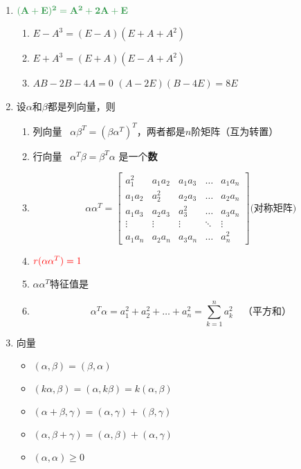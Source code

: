 \documentclass[a4paper,12pt]{article}
\begin{document}
\begin{enumerate}
        \item $\color[rgb]{0.2, 0.6, 0.3}{\mathbf{(A + E)^2 = A^2 + 2A + E}}$
        \begin{enumerate}
            \item $E - A^3 = (E - A)(E + A + A^2)$
            \item $E + A^3 = (E + A)(E - A + A^2)$
            \item $AB - 2B - 4A = 0$ \Leftrightarrow \; $(A - 2E)(B - 4E) = 8E$
        \end{enumerate}
        \item 设$\alpha$和$\beta$都是列向量，则
        \begin{enumerate}
            \item 列向量 \cdot {} \, $\alpha\beta^T = (\beta\alpha^T)^T$，两者都是$n$阶矩阵（互为转置）
            \item 行向量 \cdot {} \, $\alpha^T\beta = \beta^T\alpha$ 是一个\textbf{数}
            \item
            \[
                \alpha\alpha^T =
                \begin{bmatrix}
                    a_1^2   & a_1 a_2 & a_1 a_3 & \dots  & a_1 a_n \\
                    a_1 a_2 & a_2^2   & a_2 a_3 & \dots  & a_2 a_n \\
                    a_1 a_3 & a_2 a_3 & a_3^2   & \dots  & a_3 a_n \\
                    \vdots  & \vdots  & \vdots  & \ddots & \vdots  \\
                    a_1 a_n & a_2 a_n & a_3 a_n & \dots  & a_n^2
                \end{bmatrix} \textbf{(对称矩阵)}
            \]
            \item $\color{red}{r(\alpha\alpha^T) = 1}$
            \item $\alpha\alpha^T$特征值是{}
            \item
            \[
                \alpha^T \alpha = a_1^2 + a_2^2 + \dots + a_n^2 = \sum_{k=1}^{n} a_k^2 \quad \text{（平方和）}
            \]
        \end{enumerate}
        \item 向量
        \begin{itemize}
            \item $(\alpha, \beta) = (\beta, \alpha)$
            \item $(k\alpha, \beta) = (\alpha, k\beta) = k(\alpha, \beta)$
            \item $(\alpha + \beta, \gamma) = (\alpha, \gamma) + (\beta, \gamma)$
            \item $(\alpha, \beta + \gamma) = (\alpha, \beta) + (\alpha, \gamma)$
            \item $(\alpha, \alpha) \ge 0$
        \end{itemize}
    \end{enumerate}
\end{document}
